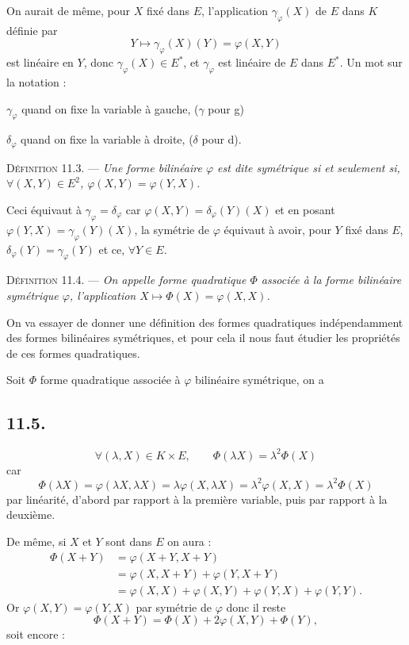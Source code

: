On aurait de même, pour $X$ fixé dans $E$, l'application $\gamma_\varphi(X)$ de $E$ dans $K$ définie par
\[
Y\longmapsto\gamma_\varphi(X)(Y)=\varphi(X,Y)
\]
est linéaire en $Y$, donc $\gamma_\varphi(X)\in E^*$, et $\gamma_\varphi$ est linéaire de $E$ dans $E^*$. Un mot sur la notation :

$\gamma_\varphi$ quand on fixe la variable à gauche, ($\gamma$ pour g)

$\delta_\varphi$ quand on fixe la variable à droite, ($\delta$ pour d).

\medskip\noindent\textsc{Définition 11.3.} --- \emph{Une forme bilinéaire $\varphi$ est dite symétrique si et seulement si, $\forall(X,Y)\in E^2$, $\varphi(X,Y)=\varphi(Y,X)$.}

Ceci équivaut à $\gamma_\varphi=\delta_\varphi$ car $\varphi(X,Y)=\delta_\varphi(Y)(X)$ et en posant $\varphi(Y,X)=\gamma_\varphi(Y)(X)$, la symétrie de $\varphi$ équivaut à avoir, pour $Y$ fixé dans $E$, $\delta_\varphi(Y)=\gamma_\varphi(Y)$ et ce, $\forall Y\in E$.

\medskip\noindent\textsc{Définition 11.4.} --- \emph{On appelle forme quadratique $\Phi$ associée à la forme bilinéaire symétrique $\varphi$, l'application $X\longmapsto\Phi(X)=\varphi(X,X)$.}

On va essayer de donner une définition des formes quadratiques indépendamment des formes bilinéaires symétriques, et pour cela il nous faut étudier les propriétés de ces formes quadratiques.

Soit $\Phi$ forme quadratique associée à $\varphi$ bilinéaire symétrique, on a

\subsection*{11.5.}
\[
\forall(\lambda,X)\in K\times E,\qquad \Phi(\lambda X)=\lambda^2\Phi(X)
\]
car
\[
\Phi(\lambda X)=\varphi(\lambda X,\lambda X)=\lambda\varphi(X,\lambda X)=\lambda^2\varphi(X,X)=\lambda^2\Phi(X)
\]
par linéarité, d'abord par rapport à la première variable, puis par rapport à la deuxième.

De même, si $X$ et $Y$ sont dans $E$ on aura :
\begin{align*}
\Phi(X+Y)&=\varphi(X+Y,X+Y)\\
&=\varphi(X,X+Y)+\varphi(Y,X+Y)\\
&=\varphi(X,X)+\varphi(X,Y)+\varphi(Y,X)+\varphi(Y,Y).
\end{align*}
Or $\varphi(X,Y)=\varphi(Y,X)$ par symétrie de $\varphi$ donc il reste
\[
\Phi(X+Y)=\Phi(X)+2\varphi(X,Y)+\Phi(Y),
\]
soit encore :

